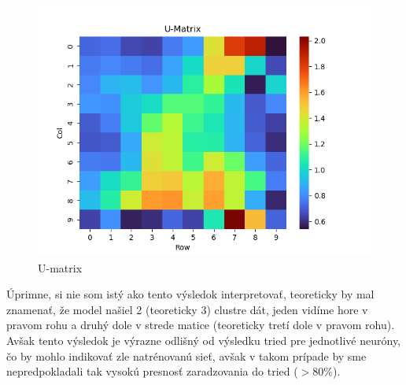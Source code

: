 \documentclass[a4paper]{article}
\begin{document}
	\begin{figure}[!h]
		\centering
		\includegraphics[width=\textwidth]{../u_matrix.png}
		\caption{U-matrix}
	\end{figure}

	Úprimne, si nie som istý ako tento výsledok interpretovať, teoreticky by mal znamenať, že model našiel 2 (teoreticky 3) clustre dát, jeden vidíme hore v pravom rohu a druhý dole v strede matice (teoreticky tretí dole v pravom rohu). Avšak tento výsledok je výrazne odlišný od výsledku tried pre jednotlivé neuróny, čo by mohlo indikovať zle natrénovanú sieť, avšak v takom prípade by sme nepredpokladali tak vysokú presnosť zaradzovania do tried ($>80\%$).  
	  
\end{document}
